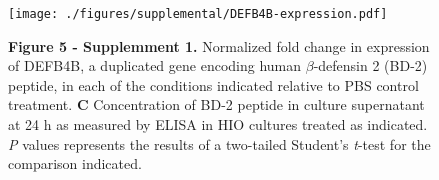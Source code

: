 \documentclass[9pt,lineo]{elife}
\date{\today}
\title{}
\begin{document}
\begin{figure}
\begin{fullwidth}
\centering\texttt{[image: ./figures/supplemental/DEFB4B-expression.pdf]}
\caption*{\textbf{Figure 5 - Supplemment 1. }Normalized fold change in expression of DEFB4B, a duplicated gene encoding human $\beta$-defensin 2 (BD-2) peptide, in each of the conditions indicated relative to PBS control treatment. \textbf{C} Concentration of BD-2 peptide in culture supernatant at 24 h as measured by ELISA in HIO cultures treated as indicated. \textit{P} values represents the results of a two-tailed Student's \textit{t}-test for the comparison indicated.}
\label{fig:fullwidth}
\end{fullwidth}
\end{figure}
\end{document}
